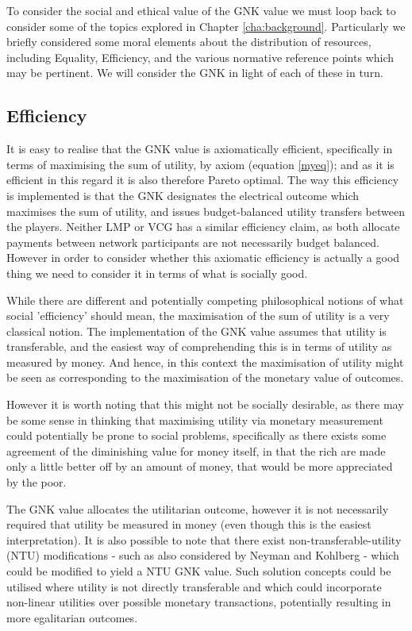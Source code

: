 To consider the social and ethical value of the GNK value we must loop back to consider some of the topics explored in Chapter \ref{cha:background}.
Particularly we briefly considered some moral elements about the distribution of resources, including Equality, Efficiency, and the various normative reference points which may be pertinent.
We will consider the GNK in light of each of these in turn.

\subsection{Efficiency}
It is easy to realise that the GNK value is axiomatically efficient, specifically in terms of maximising the sum of utility, by axiom (equation \ref{myeq}); and as it is efficient in this regard it is also therefore Pareto optimal.
The way this efficiency is implemented is that the GNK designates the electrical outcome which maximises the sum of utility, and issues budget-balanced utility transfers between the players.
Neither LMP or VCG has a similar efficiency claim, as both allocate payments between network participants are not necessarily budget balanced.
However in order to consider whether this axiomatic efficiency is actually a good thing we need to consider it in terms of what is socially good.

While there are different and potentially competing philosophical notions of what social 'efficiency' should mean, the maximisation of the sum of utility is a very classical notion.
The implementation of the GNK value assumes that utility is transferable, and the easiest way of comprehending this is in terms of utility as measured by money. And hence, in this context the maximisation of utility might be seen as corresponding to the maximisation of the monetary value of outcomes.

However it is worth noting that this might not be socially desirable, as there may be some sense in thinking that maximising utility via monetary measurement could potentially be prone to social problems, specifically as there exists some agreement of the diminishing value for money itself, in that the rich are made only a little better off by an amount of money, that would be more appreciated by the poor.

The GNK value allocates the utilitarian outcome, however it is not necessarily required that utility be measured in money (even though this is the easiest interpretation).
It is also possible to note that there exist non-transferable-utility (NTU) modifications - such as also considered by Neyman and Kohlberg \cite{value1} - which could be modified to yield a NTU GNK value.
Such solution concepts could be utilised where utility is not directly transferable and which could incorporate non-linear utilities over possible monetary transactions, potentially resulting in more egalitarian outcomes.

